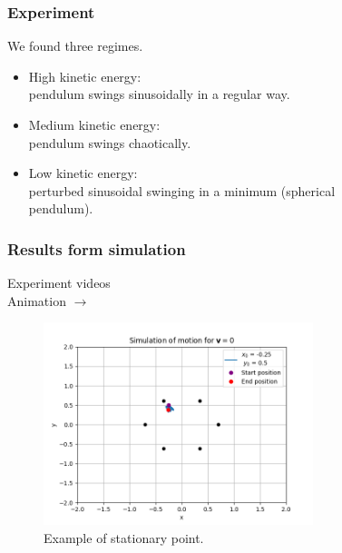 \documentclass{beamer}
\begin{document}

\begin{frame}

\frametitle{Experiment}
We found three regimes.

\begin{itemize}
\item High kinetic energy:\\
\qquad pendulum swings sinusoidally in a regular way.
\item Medium kinetic energy:\\
\qquad pendulum swings chaotically.
\item Low kinetic energy:\\
\qquad perturbed sinusoidal swinging in a minimum (spherical \\
\qquad pendulum).
\end{itemize}


\end{frame}


\begin{frame}

\frametitle{Results form simulation}
Experiment videos\\
Animation $\rightarrow$

\begin{figure}[H]
	\centering
	\includegraphics[width=0.7\textwidth]{motion 18.png}
	  \caption{Example of stationary point.}
\end{figure}

\end{frame}

\end{document}
